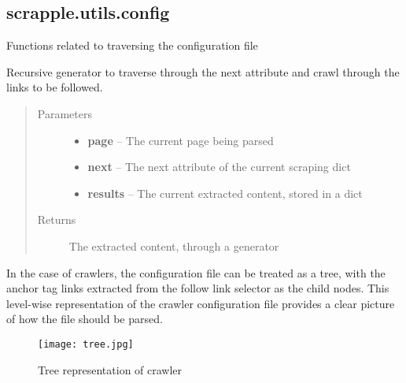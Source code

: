 \documentclass[letterpaper,12pt,english]{sphinxmanual}
\begin{document}
\label{implementation/utils:module-scrapple.utils.config}

\subsection{scrapple.utils.config}
\label{implementation/utils:scrapple-utils-config}
Functions related to traversing the configuration file

\begin{fulllineitems}
\label{implementation/utils:scrapple.utils.config.traverse_next}
Recursive generator to traverse through the next attribute and     crawl through the links to be followed.
\begin{quote}\begin{description}
\item[{Parameters}] \leavevmode\begin{itemize}
\item {} 
\textbf{page} -- The current page being parsed

\item {} 
\textbf{next} -- The next attribute of the current scraping dict

\item {} 
\textbf{results} -- The current extracted content, stored in a dict

\end{itemize}

\item[{Returns}] \leavevmode
The extracted content, through a generator

\end{description}\end{quote}

\end{fulllineitems}


In the case of crawlers, the configuration file can be treated as a tree, with the anchor tag links extracted from the follow link selector as the child nodes. This level-wise representation of the crawler configuration file provides a clear picture of how the file should be parsed.
\begin{figure}[htbp]
\centering
\capstart

\texttt{[image: tree.jpg]}
\caption{Tree representation of crawler}\end{figure}
\end{document}
